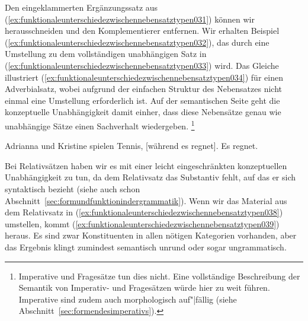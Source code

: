 Den eingeklammerten Ergänzungssatz aus (\ref{ex:funktionaleunterschiedezwischennebensatztypen031}) können wir herausschneiden und den Komplementierer entfernen.
Wir erhalten Beispiel (\ref{ex:funktionaleunterschiedezwischennebensatztypen032}), das durch eine Umstellung zu dem vollständigen unabhängigen Satz in (\ref{ex:funktionaleunterschiedezwischennebensatztypen033}) wird.
Das Gleiche illustriert (\ref{ex:funktionaleunterschiedezwischennebensatztypen034}) für einen Adverbialsatz, wobei aufgrund der einfachen Struktur des Nebensatzes nicht einmal eine Umstellung erforderlich ist.
Auf der semantischen Seite geht die konzeptuelle Unabhängigkeit damit einher, dass diese Nebensätze genau wie unabhängige Sätze einen Sachverhalt wiedergeben.%
\footnote{Imperative und Fragesätze tun dies nicht.
Eine vollständige Beschreibung der Semantik von Imperativ- und Fragesätzen würde hier zu weit führen.
Imperative sind zudem auch morphologisch auf"|fällig (siehe Abschnitt~\ref{sec:formendesimperativs}).}


\begin{exe}
  \ex\label{ex:funktionaleunterschiedezwischennebensatztypen034}
  \begin{xlist}
    \ex\label{ex:funktionaleunterschiedezwischennebensatztypen035} Adrianna und Kristine spielen Tennis, [während es regnet].
    \ex\label{ex:funktionaleunterschiedezwischennebensatztypen036} Es regnet.
  \end{xlist}
\end{exe}


Bei Relativsätzen haben wir es mit einer leicht eingeschränkten konzeptuellen Unabhängigkeit zu tun, da dem Relativsatz das Substantiv fehlt, auf das er sich syntaktisch bezieht (siehe auch schon Abschnitt~\ref{sec:formundfunktionindergrammatik}).
Wenn wir das Material aus dem Relativsatz in (\ref{ex:funktionaleunterschiedezwischennebensatztypen038}) umstellen, kommt (\ref{ex:funktionaleunterschiedezwischennebensatztypen039}) heraus.
Es sind zwar Konstituenten in allen nötigen Kategorien vorhanden, aber das Ergebnis klingt zumindest semantisch unrund oder sogar ungrammatisch.

\begin{exe}
  \ex\label{ex:funktionaleunterschiedezwischennebensatztypen037}
  \begin{xlist}
  \end{xlist}
\end{exe}

